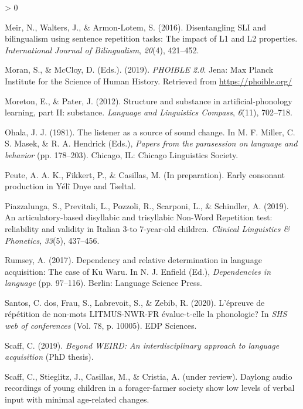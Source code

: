 \documentclass[
  american,
  ,man,floatsintext]{apa6}
\newlength{\cslhangindent}
\newenvironment{CSLReferences}[2] %
 {%
  \setlength{\parindent}{0pt}
  \ifodd #1 \everypar{\setlength{\hangindent}{\cslhangindent}}\ignorespaces\fi
  \ifnum #2 > 0
  \setlength{\parskip}{#2\baselineskip}
  \fi
 }%
 {}
\begin{document}
\begin{CSLReferences}{1}{0}
\leavevmode\hypertarget{ref-meir2016disentangling}{}%
Meir, N., Walters, J., \& Armon-Lotem, S. (2016). {Disentangling SLI and bilingualism using sentence repetition tasks: The impact of L1 and L2 properties}. \emph{International Journal of Bilingualism}, \emph{20}(4), 421--452.

\leavevmode\hypertarget{ref-phoible}{}%
Moran, S., \& McCloy, D. (Eds.). (2019). \emph{PHOIBLE 2.0}. Jena: Max Planck Institute for the Science of Human History. Retrieved from \url{https://phoible.org/}

\leavevmode\hypertarget{ref-moreton2012structure}{}%
Moreton, E., \& Pater, J. (2012). Structure and substance in artificial-phonology learning, part {II}: substance. \emph{Language and Linguistics Compass}, \emph{6}(11), 702--718.

\leavevmode\hypertarget{ref-ohala1981listener}{}%
Ohala, J. J. (1981). The listener as a source of sound change. In M. F. Miller, C. S. Masek, \& R. A. Hendrick (Eds.), \emph{Papers from the parasession on language and behavior} (pp. 178--203). Chicago, IL: Chicago Linguistics Society.

\leavevmode\hypertarget{ref-peuteIPconsonants}{}%
Peute, A. A. K., Fikkert, P., \& Casillas, M. (In preparation). Early consonant production in {Y}élî {D}nye and {T}seltal.

\leavevmode\hypertarget{ref-piazzalunga2019articulatory}{}%
Piazzalunga, S., Previtali, L., Pozzoli, R., Scarponi, L., \& Schindler, A. (2019). {An articulatory-based disyllabic and trisyllabic Non-Word Repetition test: reliability and validity in Italian 3-to 7-year-old children}. \emph{Clinical Linguistics \& Phonetics}, \emph{33}(5), 437--456.

\leavevmode\hypertarget{ref-rumsey2017dependency}{}%
Rumsey, A. (2017). Dependency and relative determination in language acquisition: The case of {Ku Waru}. In N. J. Enfield (Ed.), \emph{Dependencies in language} (pp. 97--116). Berlin: Language Science Press.

\leavevmode\hypertarget{ref-dos2020epreuve}{}%
Santos, C. dos, Frau, S., Labrevoit, S., \& Zebib, R. (2020). L'{é}preuve de r{é}p{é}tition de non-mots LITMUS-NWR-FR {é}value-t-elle la phonologie? In \emph{SHS web of conferences} (Vol. 78, p. 10005). EDP Sciences.

\leavevmode\hypertarget{ref-scaff2019}{}%
Scaff, C. (2019). \emph{Beyond {WEIRD}: An interdisciplinary approach to language acquisition} (PhD thesis).

\leavevmode\hypertarget{ref-scaff2021daylong}{}%
Scaff, C., Stieglitz, J., Casillas, M., \& Cristia, A. (under review). Daylong audio recordings of young children in a forager-farmer society show low levels of verbal input with minimal age-related changes.


\end{CSLReferences}
\end{document}
